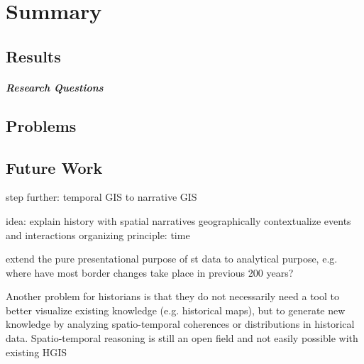 
\chapter{Summary} %
\label{cha:summary}


\section{Results} %
\label{sec:results}



\paragraph{Research Questions} %
\label{par:result_research_questions}



\section{Problems} %
\label{sec:problems}




\section{Future Work} %
\label{sec:future_work}

step further: temporal GIS to narrative GIS

idea: explain history with spatial narratives
  geographically contextualize events and interactions
  organizing principle: time

extend the pure presentational purpose of st data to analytical purpose, e.g. where have most border changes take place in previous 200 years?

Another problem for historians is that they do not necessarily need a tool to better visualize existing knowledge (e.g. historical maps), but to generate new knowledge by analyzing spatio-temporal coherences or distributions in historical data. Spatio-temporal reasoning is still an open field and not easily possible with existing HGIS

